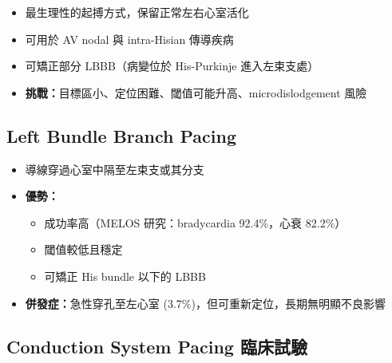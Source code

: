 \documentclass[12pt,a4paper]{article}
\begin{document}
\begin{itemize}
    \item 最生理性的起搏方式，保留正常左右心室活化
    \item 可用於 AV nodal 與 intra-Hisian 傳導疾病
    \item 可矯正部分 LBBB（病變位於 His-Purkinje 進入左束支處）
    \item \textbf{挑戰：}目標區小、定位困難、閾值可能升高、microdislodgement 風險
\end{itemize}

\subsection{Left Bundle Branch Pacing}

\begin{itemize}
    \item 導線穿過心室中隔至左束支或其分支
    \item \textbf{優勢：}
    \begin{itemize}
        \item 成功率高（MELOS 研究：bradycardia 92.4\%，心衰 82.2\%）
        \item 閾值較低且穩定
        \item 可矯正 His bundle 以下的 LBBB
    \end{itemize}
    \item \textbf{併發症：}急性穿孔至左心室 (3.7\%)，但可重新定位，長期無明顯不良影響
\end{itemize}

\subsection{Conduction System Pacing 臨床試驗}
\end{document}
